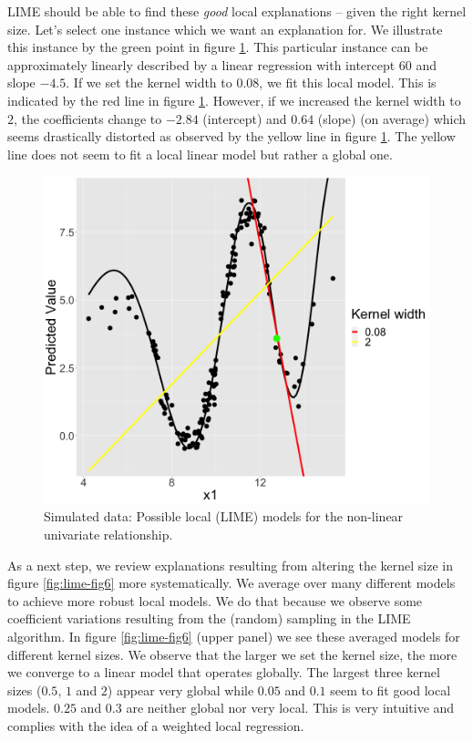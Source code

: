 \documentclass[
]{krantz}
\begin{document}
LIME should be able to find these \emph{good} local explanations -- given the right kernel size.
Let's select one instance which we want an explanation for.
We illustrate this instance by the green point in figure \ref{fig:lime-fig5}.
This particular instance can be approximately linearly described by a linear regression with intercept \(60\) and slope \(-4.5\).
If we set the kernel width to \(0.08\), we fit this local model.
This is indicated by the red line in figure \ref{fig:lime-fig5}.
However, if we increased the kernel width to \(2\), the coefficients change to \(-2.84\) (intercept) and \(0.64\) (slope) (on average) which seems drastically distorted as observed by the yellow line in figure \ref{fig:lime-fig5}.
The yellow line does not seem to fit a local linear model but rather a global one.

\begin{figure}

{\centering \includegraphics[width=0.99\linewidth]{images/04-09-05} 

}

\caption{Simulated data: Possible local (LIME) models for the non-linear univariate relationship.}\label{fig:lime-fig5}
\end{figure}

As a next step, we review explanations resulting from altering the kernel size in figure \ref{fig:lime-fig6} more systematically.
We average over many different models to achieve more robust local models.
We do that because we observe some coefficient variations resulting from the (random) sampling in the LIME algorithm.
In figure \ref{fig:lime-fig6} (upper panel) we see these averaged models for different kernel sizes.
We observe that the larger we set the kernel size, the more we converge to a linear model that operates globally.
The largest three kernel sizes (\(0.5\), \(1\) and \(2\)) appear very global while \(0.05\) and \(0.1\) seem to fit good local models.
\(0.25\) and \(0.3\) are neither global nor very local.
This is very intuitive and complies with the idea of a weighted local regression.
\end{document}
